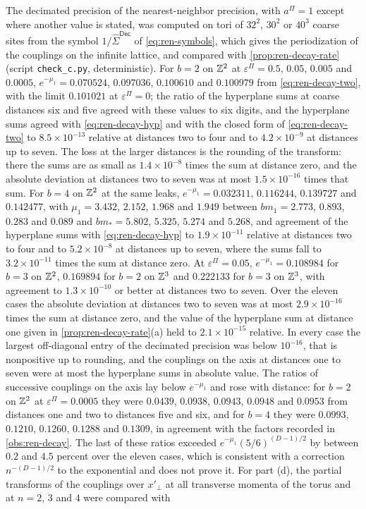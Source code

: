 \begin{numcheck}\label{chk:ren-decay-rate}
The decimated precision of the nearest-neighbor precision, with $a^\Pi=1$ except where another value is stated, was computed on tori of $32^2$, $30^2$ or $40^3$ coarse sites from the symbol $1/\hat\Sigma^{\mathsf{Dec}}$ of \eqref{eq:ren-symbols}, which gives the periodization of the couplings on the infinite lattice, and compared with \cref{prop:ren-decay-rate} (script \texttt{check\_c.py}, deterministic). For $b=2$ on $\mathbb{Z}^2$ at $\varepsilon^\Pi=0.5$, $0.05$, $0.005$ and $0.0005$, $e^{-\mu_1}=0.070524$, $0.097036$, $0.100610$ and $0.100979$ from \eqref{eq:ren-decay-two}, with the limit $0.101021$ at $\varepsilon^\Pi=0$; the ratio of the hyperplane sums at coarse distances six and five agreed with these values to six digits, and the hyperplane sums agreed with \eqref{eq:ren-decay-hyp} and with the closed form of \eqref{eq:ren-decay-two} to $8.5\times10^{-13}$ relative at distances two to four and to $4.2\times10^{-9}$ at distances up to seven. The loss at the larger distances is the rounding of the transform: there the sums are as small as $1.4\times10^{-8}$ times the sum at distance zero, and the absolute deviation at distances two to seven was at most $1.5\times10^{-16}$ times that sum. For $b=4$ on $\mathbb{Z}^2$ at the same leaks, $e^{-\mu_1}=0.032311$, $0.116244$, $0.139727$ and $0.142477$, with $\mu_1=3.432$, $2.152$, $1.968$ and $1.949$ between $bm_1=2.773$, $0.893$, $0.283$ and $0.089$ and $bm_\ast=5.802$, $5.325$, $5.274$ and $5.268$, and agreement of the hyperplane sums with \eqref{eq:ren-decay-hyp} to $1.9\times10^{-11}$ relative at distances two to four and to $5.2\times10^{-8}$ at distances up to seven, where the sums fall to $3.2\times10^{-11}$ times the sum at distance zero. At $\varepsilon^\Pi=0.05$, $e^{-\mu_1}=0.108984$ for $b=3$ on $\mathbb{Z}^2$, $0.169894$ for $b=2$ on $\mathbb{Z}^3$ and $0.222133$ for $b=3$ on $\mathbb{Z}^3$, with agreement to $1.3\times10^{-10}$ or better at distances two to seven. Over the eleven cases the absolute deviation at distances two to seven was at most $2.9\times10^{-16}$ times the sum at distance zero, and the value of the hyperplane sum at distance one given in \cref{prop:ren-decay-rate}(a) held to $2.1\times10^{-15}$ relative. In every case the largest off-diagonal entry of the decimated precision was below $10^{-16}$, that is nonpositive up to rounding, and the couplings on the axis at distances one to seven were at most the hyperplane sums in absolute value. The ratios of successive couplings on the axis lay below $e^{-\mu_1}$ and rose with distance: for $b=2$ on $\mathbb{Z}^2$ at $\varepsilon^\Pi=0.0005$ they were $0.0439$, $0.0938$, $0.0943$, $0.0948$ and $0.0953$ from distances one and two to distances five and six, and for $b=4$ they were $0.0993$, $0.1210$, $0.1260$, $0.1288$ and $0.1309$, in agreement with the factors recorded in \cref{obs:ren-decay}. The last of these ratios exceeded $e^{-\mu_1}(5/6)^{(D-1)/2}$ by between $0.2$ and $4.5$ percent over the eleven cases, which is consistent with a correction $n^{-(D-1)/2}$ to the exponential and does not prove it. For part (d), the partial transforms of the couplings over $x'_\perp$ at all transverse momenta of the torus and at $n=2$, $3$ and $4$ were compared with 
\end{numcheck}
